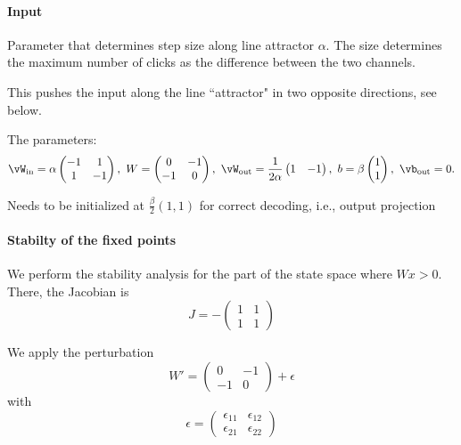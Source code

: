 \documentclass{article} %
\newcounter{ct}
\newcommand{\win}{\vW_{\text{in}}}
\newcommand{\wout}{\vW_{\text{out}}}
\newcommand{\bout}{\vb_{\text{out}}}
\theoremstyle{definition}
\theoremstyle{remark}
\begin{document}
\paragraph{Input}
Parameter that determines step size along line attractor $\alpha$.
The size determines the maximum number of clicks as the difference between the two channels. 

This pushes the input along the line ``attractor" in two opposite directions, %
see below.

The parameters:
\begin{equation}\label{eq:bla}
\win = \alpha
\begin{pmatrix}
-1  &  1 \\
1  &  -1
\end{pmatrix}, \
W = 
\begin{pmatrix}
0  &  -1 \\
-1  &  0
\end{pmatrix}, \
\wout = \frac{1}{2\alpha}
\begin{pmatrix}
1  &  -1 
\end{pmatrix}, \
b = \beta
\begin{pmatrix}
1 \\  1 
\end{pmatrix}, \
\bout = 0.
\end{equation}

Needs to be initialized at $\tfrac{\beta}{2}(1,1)$ for correct decoding, i.e., output projection



\paragraph{Stabilty of the fixed points}
We perform the stability analysis for the part of the state space where $Wx>0$.
There, the Jacobian is
\begin{equation}
J = -
\begin{pmatrix}
1  &  1 \\
1  &  1
\end{pmatrix}
\end{equation}

We apply the perturbation
\begin{equation}
W' = 
\begin{pmatrix}
0  &  -1 \\
-1  &  0
\end{pmatrix}
+ \epsilon
\end{equation}
with 
\begin{equation}
\epsilon = 
\begin{pmatrix}
\epsilon_{11}  &  \epsilon_{12} \\
\epsilon_{21}  &  \epsilon_{22}
\end{pmatrix}
\end{equation}
\end{document}
